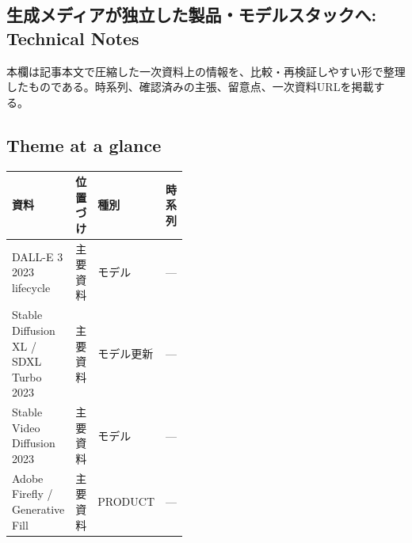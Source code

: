 \subsection*{生成メディアが独立した製品・モデルスタックへ: Technical Notes}
本欄は記事本文で圧縮した一次資料上の情報を、比較・再検証しやすい形で整理したものである。時系列、確認済みの主張、留意点、一次資料URLを掲載する。
\smallskip
{}\par
\medskip
\subsection*{Theme at a glance}
\begin{center}
\footnotesize
\begin{tabularx}{\linewidth}{@{}p{0.20\linewidth}p{0.10\linewidth}p{0.14\linewidth}X@{}}
\toprule
資料 & 位置づけ & 種別 & 時系列 \\
\midrule
DALL-E 3 2023 lifecycle & 主要資料 & モデル & — \\
Stable Diffusion XL / SDXL Turbo 2023 & 主要資料 & モデル更新 & — \\
Stable Video Diffusion 2023 & 主要資料 & モデル & — \\
Adobe Firefly / Generative Fill & 主要資料 & PRODUCT & — \\
\bottomrule
\end{tabularx}
\end{center}
\normalsize

